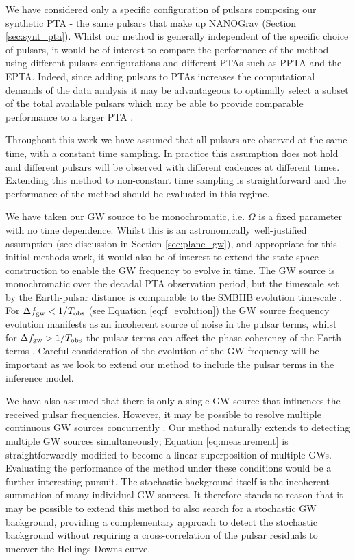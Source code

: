\documentclass[fleqn,usenatbib,useAMS]{mnras}
\begin{document}
We have considered only a specific configuration of pulsars composing our synthetic PTA - the same pulsars that make up NANOGrav (Section \ref{sec:synt_pta}). Whilst our method is generally independent of the specific choice of pulsars, it would be of interest to compare the performance of the method using different pulsars configurations and different PTAs such as PPTA and the EPTA. Indeed, since adding pulsars to PTAs increases the computational demands of the data analysis it may be advantageous to optimally select a subset of the total available pulsars which may be able to provide comparable performance to a larger PTA  \citep{2023MNRAS.518.1802S}.  \newline 

Throughout this work we have assumed that all pulsars are observed at the same time, with a constant time sampling. In practice this assumption does not hold and different pulsars will be observed with different cadences at different times. Extending this method to non-constant time sampling is straightforward and the performance of the method should be evaluated in this regime. \newline 

We have taken our GW source to be monochromatic, i.e. $\Omega$ is a fixed parameter with no time dependence. Whilst this is an astronomically well-justified assumption (see discussion in Section \ref{sec:plane_gw}), and appropriate for this initial methods work, it would also be of interest to extend the state-space construction to enable the GW frequency to evolve in time. The GW source is monochromatic over the decadal PTA observation period, but the timescale set by the Earth-pulsar distance is comparable to the SMBHB evolution timescale \citep{Sesana2010}. For $\Delta f_{\rm gw} < 1 / T_{\rm obs}$ (see Equation \ref{eq:f_evolution}) the GW source frequency evolution manifests as an incoherent source of noise in the pulsar terms, whilst for  $\Delta f_{\rm gw} > 1 / T_{\rm obs}$ the pulsar terms can affect the phase coherency of the Earth terms \citep{Perrodin2018}. Careful consideration of the evolution of the GW frequency will be important as we look to extend our method to include the pulsar terms in the inference model. \newline 


We have also assumed that there is only a single GW source that influences the received pulsar frequencies. However, it may be possible to resolve multiple continuous GW sources concurrently \citep{PhysRevD.85.044034}. Our method naturally extends to detecting multiple GW sources simultaneously; Equation \ref{eq:measurement} is straightforwardly modified to become a linear superposition of multiple GWs. Evaluating the performance of the method under these conditions would be a further interesting pursuit. The stochastic background itself is the incoherent summation of many individual GW sources. It therefore stands to reason that it may be possible to extend this method to also search for a stochastic GW background, providing a complementary approach to detect the stochastic background without requiring a cross-correlation of the pulsar residuals to uncover the Hellings-Downs curve. \newline 
\end{document}
